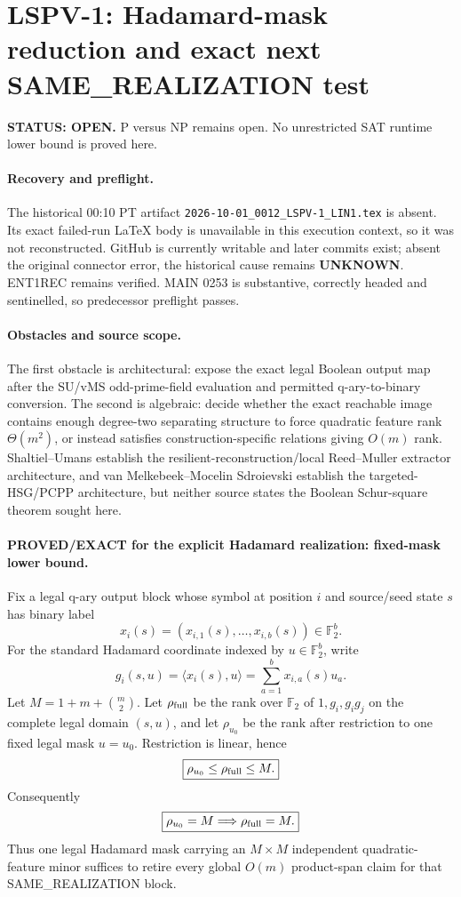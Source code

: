 \documentclass[11pt]{article}
\begin{document}
\section*{LSPV-1: Hadamard-mask reduction and exact next SAME\_REALIZATION test}
\textbf{STATUS: OPEN.} P versus NP remains open. No unrestricted SAT runtime lower bound is proved here.

\paragraph{Recovery and preflight.}
The historical 00:10 PT artifact \texttt{2026-10-01\_0012\_LSPV-1\_LIN1.tex} is absent. Its exact failed-run LaTeX body is unavailable in this execution context, so it was not reconstructed. GitHub is currently writable and later commits exist; absent the original connector error, the historical cause remains \textbf{UNKNOWN}. ENT1REC remains verified. MAIN 0253 is substantive, correctly headed and sentinelled, so predecessor preflight passes.

\paragraph{Obstacles and source scope.}
The first obstacle is architectural: expose the exact legal Boolean output map after the SU/vMS odd-prime-field evaluation and permitted q-ary-to-binary conversion. The second is algebraic: decide whether the exact reachable image contains enough degree-two separating structure to force quadratic feature rank $\Theta(m^2)$, or instead satisfies construction-specific relations giving $O(m)$ rank. Shaltiel--Umans establish the resilient-reconstruction/local Reed--Muller extractor architecture, and van Melkebeek--Mocelin Sdroievski establish the targeted-HSG/PCPP architecture, but neither source states the Boolean Schur-square theorem sought here.

\paragraph{PROVED/EXACT for the explicit Hadamard realization: fixed-mask lower bound.}
Fix a legal q-ary output block whose symbol at position $i$ and source/seed state $s$ has binary label
\[
x_i(s)=(x_{i,1}(s),\ldots,x_{i,b}(s))\in\mathbb F_2^b.
\]
For the standard Hadamard coordinate indexed by $u\in\mathbb F_2^b$, write
\[
g_i(s,u)=\langle x_i(s),u\rangle=\sum_{a=1}^b x_{i,a}(s)u_a.
\]
Let $M=1+m+\binom m2$. Let $\rho_{\rm full}$ be the rank over $\mathbb F_2$ of $1,g_i,g_i g_j$ on the complete legal domain $(s,u)$, and let $\rho_{u_0}$ be the rank after restriction to one fixed legal mask $u=u_0$. Restriction is linear, hence
\[
\boxed{\rho_{u_0}\le\rho_{\rm full}\le M.}
\]
Consequently
\[
\boxed{\rho_{u_0}=M\Longrightarrow\rho_{\rm full}=M.}
\]
Thus one legal Hadamard mask carrying an $M\times M$ independent quadratic-feature minor suffices to retire every global $O(m)$ product-span claim for that SAME\_REALIZATION block.
\end{document}
